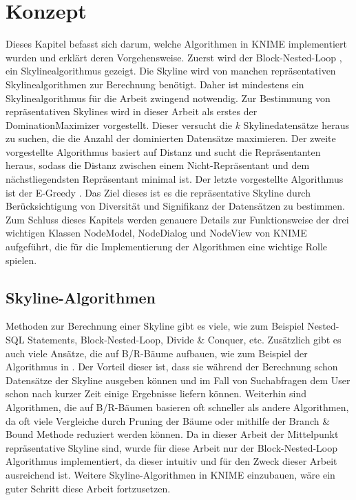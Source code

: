 \chapter{Konzept}
\label{ch:Konzept}
Dieses Kapitel befasst sich darum, welche Algorithmen in KNIME implementiert wurden und erklärt deren Vorgehensweise. Zuerst wird der Block-Nested-Loop \cite{borzsony2001skyline}, ein Skylinealgorithmus gezeigt. Die Skyline wird von manchen repräsentativen Skylinealgorithmen zur Berechnung benötigt. Daher ist mindestens ein Skylinealgorithmus für die Arbeit zwingend notwendig. Zur Bestimmung von repräsentativen Skylines wird in dieser Arbeit als erstes der DominationMaximizer \cite{4221657} vorgestellt. Dieser versucht die $k$ Skylinedatensätze heraus zu suchen, die die Anzahl der dominierten Datensätze maximieren. Der zweite vorgestellte Algorithmus basiert auf Distanz \cite{Tao:2009:DRS:1546683.1547325} und sucht die Repräsentanten heraus, sodass die Distanz zwischen einem Nicht-Repräsentant und dem nächstliegendsten Repräsentant minimal ist. Der letzte vorgestellte Algorithmus ist der E-Greedy \cite{magnani2014taking}. Das Ziel dieses ist es die repräsentative Skyline durch Berücksichtigung von Diversität und Signifikanz der Datensätzen zu bestimmen.
Zum Schluss dieses Kapitels werden genauere Details zur Funktionsweise der drei wichtigen Klassen NodeModel, NodeDialog und NodeView von KNIME aufgeführt, die für die Implementierung der Algorithmen eine wichtige Rolle spielen.
\section{Skyline-Algorithmen}
\label{ch:Analyse:sec:skyAlgos}
Methoden zur Berechnung einer Skyline gibt es viele, wie zum Beispiel Nested-SQL Statements, Block-Nested-Loop, Divide \& Conquer, etc.
Zusätzlich gibt es auch viele Ansätze, die auf B/R-Bäume aufbauen, wie zum Beispiel der Algorithmus in \cite{Papadias:2003:OPA:872757.872814}. Der Vorteil dieser ist, dass sie während der Berechnung schon Datensätze der Skyline ausgeben können und im Fall von Suchabfragen dem User schon nach kurzer Zeit einige Ergebnisse liefern können. Weiterhin sind Algorithmen, die auf B/R-Bäumen basieren oft schneller als andere Algorithmen, da oft viele Vergleiche durch Pruning der Bäume oder mithilfe der Branch \& Bound Methode reduziert werden können. 
Da in dieser Arbeit der Mittelpunkt repräsentative Skyline sind, wurde für diese Arbeit nur der Block-Nested-Loop Algorithmus implementiert, da dieser intuitiv und für den Zweck dieser Arbeit ausreichend ist. Weitere Skyline-Algorithmen in KNIME einzubauen, wäre ein guter Schritt diese Arbeit fortzusetzen. 
